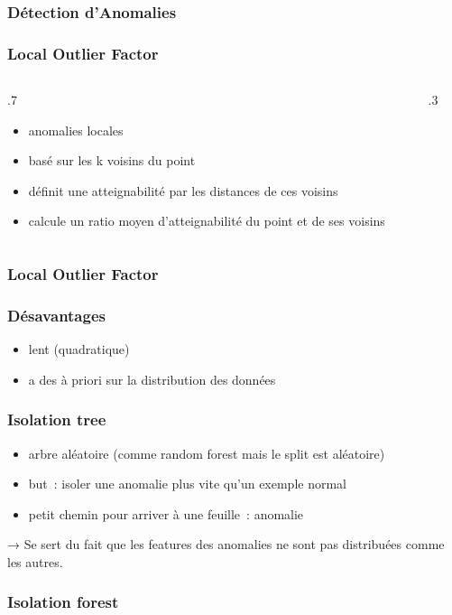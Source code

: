 \begin{frame}
  \frametitle{Détection d'Anomalies}
\end{frame}

\begin{frame}
  \frametitle{Local Outlier Factor}
  \begin{columns}
    \begin{column}{.7\tw}
      \begin{itemize}[<+->]
      \item anomalies locales
      \item basé sur les k voisins du point
      \item définit une \og atteignabilité\fg{} par les distances de
        ces voisins
      \item calcule un ratio moyen d'atteignabilité du point et de ses
        voisins
      \end{itemize}
    \end{column}
    \begin{column}{.3\tw}
    \end{column}
  \end{columns}
\end{frame}

\begin{frame}
  \frametitle{Local Outlier Factor}
\end{frame}

\begin{frame}
  \frametitle{Désavantages}
  \begin{itemize}
  \item lent (quadratique)
  \item a des à priori sur la distribution des données
  \end{itemize}
\end{frame}

\begin{frame}
  \frametitle{Isolation tree}
  \begin{itemize}
  \item arbre aléatoire (comme random forest mais le split est
    aléatoire)
  \item but : isoler une anomalie plus vite qu'un exemple normal
  \item petit chemin pour arriver à une feuille : anomalie
  \end{itemize}
  → Se sert du fait que les features des anomalies ne sont pas
  distribuées comme les autres.
\end{frame}

\begin{frame}
  \frametitle{Isolation forest}
\end{frame}

